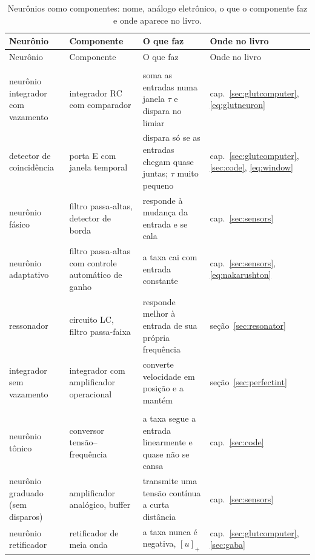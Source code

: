 \begin{center}
\footnotesize
\setlength{\tabcolsep}{3pt}
\renewcommand{\arraystretch}{1.15}
\begin{longtable}{>{\raggedright}p{3.1cm}>{\raggedright}p{3.3cm}>{\raggedright}p{4.7cm}>{\raggedright\arraybackslash}p{2.4cm}}
\caption{Neurônios como componentes: nome, análogo eletrônico, o que o componente faz e onde aparece no livro.}\label{tab:eetypes}\\
\toprule
Neurônio & Componente & O que faz & Onde no livro \\
\midrule
\endfirsthead
\toprule
Neurônio & Componente & O que faz & Onde no livro \\
\midrule
\endhead
\bottomrule
\endfoot
\multicolumn{4}{l}{\emph{Filtros e integradores}} \\
neurônio integrador com vazamento & integrador RC com comparador & soma as entradas numa janela $\tau$ e dispara no limiar & cap.~\ref{sec:glutcomputer}, \eqref{eq:glutneuron} \\
detector de coincidência & porta E com janela temporal & dispara só se as entradas chegam quase juntas; $\tau$ muito pequeno & cap.~\ref{sec:glutcomputer}, \ref{sec:code}, \eqref{eq:window} \\
neurônio fásico & filtro passa-altas, detector de borda & responde à mudança da entrada e se cala & cap.~\ref{sec:sensors} \\
neurônio adaptativo & filtro passa-altas com controle automático de ganho & a taxa cai com entrada constante & cap.~\ref{sec:sensors}, \eqref{eq:nakarushton} \\
ressonador & circuito LC, filtro passa-faixa & responde melhor à entrada de sua própria frequência & seção~\ref{sec:resonator} \\
integrador sem vazamento & integrador com amplificador operacional & converte velocidade em posição e a mantém & seção~\ref{sec:perfectint} \\
\midrule
\multicolumn{4}{l}{\emph{Conversores}} \\
neurônio tônico & conversor tensão--frequência & a taxa segue a entrada linearmente e quase não se cansa & cap.~\ref{sec:code} \\
neurônio graduado (sem disparos) & amplificador analógico, buffer & transmite uma tensão contínua a curta distância & cap.~\ref{sec:sensors} \\
neurônio retificador & retificador de meia onda & a taxa nunca é negativa, $[u]_+$ & cap.~\ref{sec:glutcomputer}, \ref{sec:gaba} \\

\end{longtable}
\end{center}

